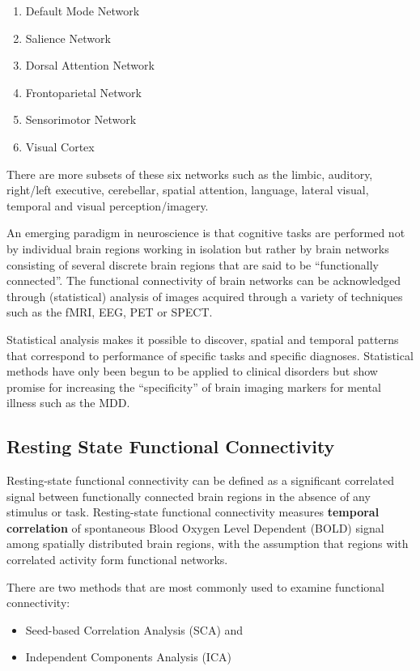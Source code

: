 \documentclass{article}
\begin{document}
\begin{enumerate}[nosep]
  \item Default Mode Network
  \item Salience Network
  \item Dorsal Attention Network
  \item Frontoparietal Network
  \item Sensorimotor Network
  \item Visual Cortex
\end{enumerate}

There are more subsets of these six networks such as the limbic,
auditory, right/left executive, cerebellar, spatial attention,
language, lateral visual, temporal and visual perception/imagery.

An emerging paradigm in neuroscience is that cognitive tasks are
performed not by individual brain regions working in isolation but
rather by brain networks consisting of several discrete brain regions
that are said to be ``functionally connected''. The functional
connectivity of brain networks can be acknowledged through
(statistical) analysis of images acquired through a variety of
techniques such as the fMRI, EEG, PET or SPECT.

Statistical analysis makes it possible to discover, spatial and
temporal patterns that correspond to performance of specific tasks and
specific diagnoses. Statistical methods have only been begun to be
applied to clinical disorders but show promise for increasing the
``specificity'' of brain imaging markers for mental illness such as
the MDD.

\subsection{Resting State Functional Connectivity}

Resting-state functional connectivity can be defined as a %
significant correlated signal between functionally connected brain
regions in the absence of any stimulus or task. Resting-state
functional connectivity measures \textbf{temporal correlation} of
spontaneous Blood Oxygen Level Dependent (BOLD) signal among spatially
distributed brain regions, with the assumption that regions with
correlated activity form functional networks.

There are two methods that are most commonly used to examine
functional connectivity:
\begin{itemize}[nosep]
  \item Seed-based Correlation Analysis (SCA) and
  \item Independent Components Analysis (ICA)
\end{itemize}
\end{document}
